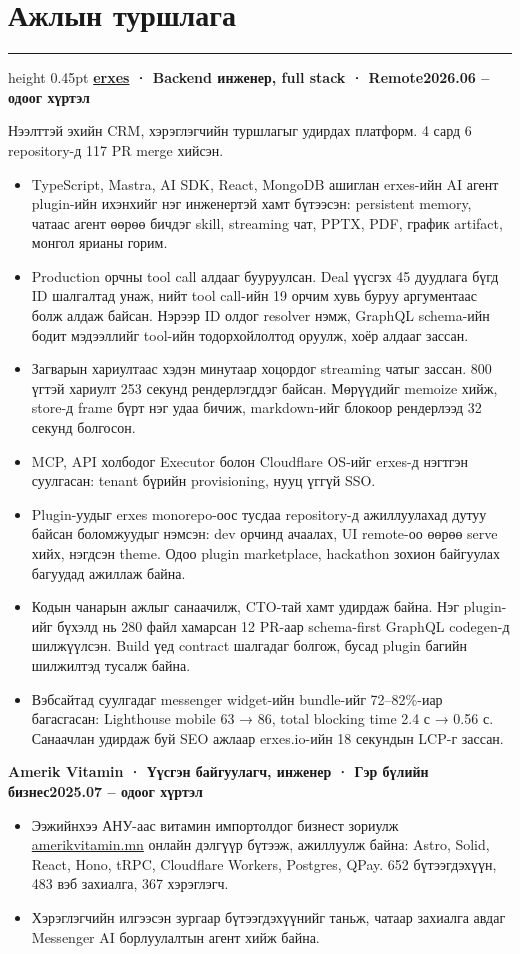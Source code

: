 \documentclass[9.5pt,letterpaper]{article}
\newcommand{\cvsection}[1]{\section*{#1}\vspace{3pt}\hrule height 0.45pt\vspace{3pt}}
\newcommand{\dated}[2]{#1\hfill#2\par}
\begin{document}
\cvsection{Ажлын туршлага}
\dated{\textbf{\href{https://github.com/erxes/erxes}{\textcolor{linkblue}{erxes}} · Backend инженер, full stack · Remote}}{\textbf{2026.06 – одоог хүртэл}}
Нээлттэй эхийн CRM, хэрэглэгчийн туршлагыг удирдах платформ. 4 сард 6 repository-д 117 PR merge хийсэн.
\begin{itemize}
  \item TypeScript, Mastra, AI SDK, React, MongoDB ашиглан erxes-ийн AI агент plugin-ийн ихэнхийг нэг инженертэй хамт бүтээсэн: persistent memory, чатаас агент өөрөө бичдэг skill, streaming чат, PPTX, PDF, график artifact, монгол ярианы горим.
  \item Production орчны tool call алдааг бууруулсан. Deal үүсгэх 45 дуудлага бүгд ID шалгалтад унаж, нийт tool call-ийн 19 орчим хувь буруу аргументаас болж алдаж байсан. Нэрээр ID олдог resolver нэмж, GraphQL schema-ийн бодит мэдээллийг tool-ийн тодорхойлолтод оруулж, хоёр алдааг зассан.
  \item Загварын хариултаас хэдэн минутаар хоцордог streaming чатыг зассан. 800 үгтэй хариулт 253 секунд рендерлэгддэг байсан. Мөрүүдийг memoize хийж, store-д frame бүрт нэг удаа бичиж, markdown-ийг блокоор рендерлээд 32 секунд болгосон.
  \item MCP, API холбодог Executor болон Cloudflare OS-ийг erxes-д нэгтгэн суулгасан: tenant бүрийн provisioning, нууц үггүй SSO.
  \item Plugin-уудыг erxes monorepo-оос тусдаа repository-д ажиллуулахад дутуу байсан боломжуудыг нэмсэн: dev орчинд ачаалах, UI remote-оо өөрөө serve хийх, нэгдсэн theme. Одоо plugin marketplace, hackathon зохион байгуулах багуудад ажиллаж байна.
  \item Кодын чанарын ажлыг санаачилж, CTO-тай хамт удирдаж байна. Нэг plugin-ийг бүхэлд нь 280 файл хамарсан 12 PR-аар schema-first GraphQL codegen-д шилжүүлсэн. Build үед contract шалгадаг болгож, бусад plugin багийн шилжилтэд тусалж байна.
  \item Вэбсайтад суулгадаг messenger widget-ийн bundle-ийг 72–82\%-иар багасгасан: Lighthouse mobile 63 → 86, total blocking time 2.4 с → 0.56 с. Санаачлан удирдаж буй SEO ажлаар erxes.io-ийн 18 секундын LCP-г зассан.
\end{itemize}
\dated{\textbf{Amerik Vitamin · Үүсгэн байгуулагч, инженер · Гэр бүлийн бизнес}}{\textbf{2025.07 – одоог хүртэл}}
\begin{itemize}
  \item Ээжийнхээ АНУ-аас витамин импортолдог бизнест зориулж \href{https://amerikvitamin.mn}{amerikvitamin.mn} онлайн дэлгүүр бүтээж, ажиллуулж байна: Astro, Solid, React, Hono, tRPC, Cloudflare Workers, Postgres, QPay. 652 бүтээгдэхүүн, 483 вэб захиалга, 367 хэрэглэгч.
  \item Хэрэглэгчийн илгээсэн зургаар бүтээгдэхүүнийг таньж, чатаар захиалга авдаг Messenger AI борлуулалтын агент хийж байна.
\end{itemize}
\end{document}
